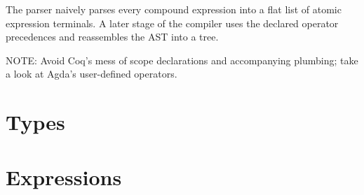\documentclass{article}
\begin{document}
The parser naively parses every compound expression into a flat list of atomic
expression terminals. A later stage of the compiler uses the declared operator
precedences and reassembles the AST into a tree.

NOTE: Avoid Coq's mess of scope declarations and accompanying plumbing; take
a look at Agda's user-defined operators.

\section{Types}

\section{Expressions}
\end{document}
